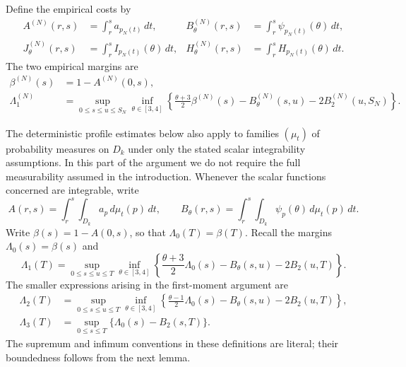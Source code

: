 \documentclass[11pt]{article}
\numberwithin{equation}{section}
\theoremstyle{definition}
\theoremstyle{remark}
\newcommand{\1}{\mathbf 1}
\begin{document}
Define the empirical costs by
\begin{align*}
 A^{(N)}(r,s)&=\int_r^s a_{p_N(t)}\,dt,&
 B^{(N)}_\theta(r,s)&=\int_r^s\psi_{p_N(t)}(\theta)\,dt,\\
 J^{(N)}_\theta(r,s)&=\int_r^s I_{p_N(t)}(\theta)\,dt,&
 H^{(N)}_\theta(r,s)&=\int_r^s H_{p_N(t)}(\theta)\,dt.
\end{align*}
The two empirical margins are
\begin{align}%
\label{eq:empirical-margins}
 \beta^{(N)}(s)&=1-A^{(N)}(0,s),\nonumber\\
 \Lambda_1^{(N)}&=\sup_{0\le s\le u\le S_N}\inf_{\theta\in[3,4]}
 \left\{\frac{\theta+3}{2}\beta^{(N)}(s)
       -B^{(N)}_\theta(s,u)-2B^{(N)}_2(u,S_N)\right\}.
\end{align}

The deterministic profile estimates below also apply to families
$(\mu_t)$ of probability measures on $D_k$ under only the stated
scalar integrability assumptions. In this part of the argument we do
not require the full measurability assumed in the introduction.
Whenever the scalar functions concerned are integrable, write
\[
 A(r,s)=\int_r^s\int_{D_k}a_p\,d\mu_t(p)\,dt,\qquad
 B_\theta(r,s)=\int_r^s\int_{D_k}\psi_p(\theta)\,d\mu_t(p)\,dt.
\]
Write $\beta(s)=1-A(0,s)$, so that $\Lambda_0(T)=\beta(T)$.
Recall the margins $\Lambda_0(s)=\beta(s)$ and
\begin{equation}%
\label{eq:macro-margin}
 \Lambda_1(T)=\sup_{0\le s\le u\le T}\inf_{\theta\in[3,4]}
 \left\{\frac{\theta+3}{2}\Lambda_0(s)
             -B_\theta(s,u)-2B_2(u,T)\right\}.
\end{equation}
The smaller expressions arising in the first-moment argument are
\begin{align}%
\label{eq:auxiliary-margins}
 \Lambda_2(T)&=\sup_{0\le s\le u\le T}\inf_{\theta\in[3,4]}
 \left\{\frac{\theta-1}{2}\Lambda_0(s)
             -B_\theta(s,u)-2B_2(u,T)\right\},\nonumber\\
 \Lambda_3(T)&=\sup_{0\le s\le T}\{\Lambda_0(s)-B_2(s,T)\}.
\end{align}
The supremum and infimum conventions in these definitions are literal;
their boundedness follows from the next lemma.
\end{document}
